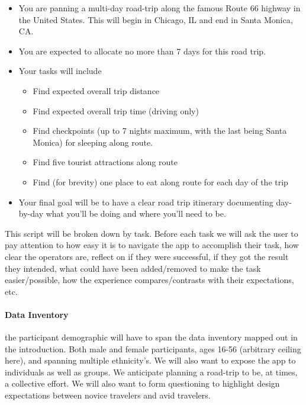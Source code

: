 \begin{itemize}
\item
  You are panning a multi-day road-trip along the famous Route 66 highway in the United States. This will begin in Chicago, IL and end in Santa Monica, CA.
\item
  You are expected to allocate no more than 7 days for this road trip.
\item
  Your tasks will include
  \begin{itemize}
  \item
    Find expected overall trip distance
  \item
    Find expected overall trip time (driving only)
  \item
    Find checkpoints (up to 7 nights maximum, with the last being Santa Monica) for sleeping along route.
  \item
    Find five tourist attractions along route
  \item
    Find (for brevity) one place to eat along route for each day of the trip
  \end{itemize}
\item
  Your final goal will be to have a clear road trip itinerary documenting day-by-day what you'll be doing and where you'll need to be.
\end{itemize}

This script will be broken down by task. Before each task we will ask the user to pay attention to how easy it is to navigate the app to accomplish their task, how clear the operators are, reflect on if they were successful, if they got the result they intended, what could have been added/removed to make the task easier/possible, how the experience compares/contrasts with their expectations, etc.

\paragraph{Data Inventory} the participant demographic will have to span the data inventory mapped out in the introduction. Both male and female participants, ages 16-56 (arbitrary ceiling here), and spanning multiple ethnicity's. We will also want to expose the app to individuals as well as groups. We anticipate planning a road-trip to be, at times, a collective effort. We will also want to form questioning to highlight design expectations between novice travelers and avid travelers.

